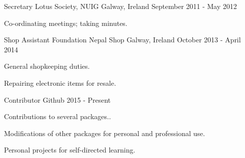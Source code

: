 


\begin{cventries}


\cventry
{Secretary} %
{Lotus Society, NUIG} %
{Galway, Ireland} %
{September 2011 - May 2012} %
{ %
\begin{cvitems}
\item {Co-ordinating meetings; taking minutes.}
\end{cvitems}
}


\cventry
{Shop Assistant} %
{Foundation Nepal Shop} %
{Galway, Ireland} %
{October 2013 - April 2014} %
{ %
\begin{cvitems}
\item {General shopkeeping duties.}
\item {Repairing electronic items for resale.}
\end{cvitems}
}

\cventry
{Contributor} %
{Github} %
{} %
{2015 - Present} %
{ %
\begin{cvitems}
\item {Contributions to several packages..}
\item {Modifications of other packages for personal and professional use.}
\item {Personal projects for self-directed learning.}
\end{cvitems}
}


\end{cventries}
